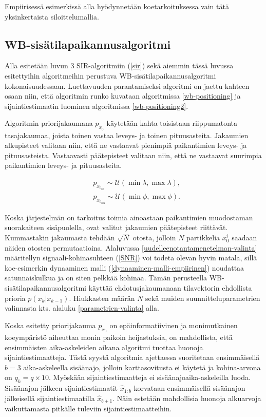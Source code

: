 \documentclass[
  12pt,
  a4paper, twoside]{book}
\begin{document}
Empiirisessä esimerkissä alla hyödynnetään koetarkoituksessa vain tätä yksinkertaista siloittelumallia.

\subsection{WB-sisätilapaikannusalgoritmi}

Alla esitetään luvun 3 SIR-algoritmiin (\ref{sir}) sekä aiemmin tässä luvussa esitettyihin algoritmeihin perustuva WB-sisätilapaikannusalgoritmi kokonaisuudessaan. Luettavuuden parantamiseksi algoritmi on jaettu kahteen osaan niin, että algoritmin runko kuvataan algoritmissa \ref{wb-positioning} ja sijaintiestimaatin luominen algoritmissa \ref{wb-positioning2}.

Algoritmin priorijakaumana \(p_{x_0}\) käytetään kahta toisistaan riippumatonta tasajakaumaa, joista toinen vastaa leveys- ja toinen pituusasteita. Jakaumien alkupisteet valitaan niin, että ne vastaavat pienimpiä paikantimien leveys- ja pituusasteista. Vastaavasti päätepisteet valitaan niin, että ne vastaavat suurimpia paikantimien leveys- ja pituusasteita.

\begin{align} \label{priorijakauma}
&p_{x_{0_{\text{lat}}}}\sim\mathcal{U}(\min{\lambda},\max{\lambda}),\\
&p_{x_{0_{\text{lon}}}}\sim\mathcal{U}(\min{\phi},\max{\phi}).
\end{align}

\noindent Koska järjestelmän on tarkoitus toimia ainoastaan paikantimien muodostaman suorakaiteen sisäpuolella, ovat valitut jakaumien päätepisteet riittävät. Kummastakin jakaumasta tehdään \(\sqrt{N}\) otosta, jolloin \(N\) partikkelia \(x^i_0\) saadaan näiden otosten permutaatioina. Alaluvussa \ref{uudelleenotantamenetelman-valinta} määritellyn signaali-kohinasuhteen (\ref{SNR}) voi todeta olevan hyvin matala, sillä koe-esimerkin dynaaminen malli (\ref{dynaaminen-malli-empiirinen}) noudattaa satunnaiskulkua ja on siten pelkkää kohinaa. Tämän perusteella WB-sisätilapaikannusalgoritmi käyttää ehdotusjakaumanaan tilavektorin ehdollista prioria \(p(x_k|x_{k-1})\). Hiukkasten määrän \(N\) sekä muiden suunnitteluparametrien valinnasta kts. alaluku \ref{parametrien-valinta} alla.

Koska esitetty priorijakauma \(p_{x_0}\) on epäinformatiivinen ja monimutkainen koeympäristö aiheuttaa monin paikoin heijastuksia, on mahdollista, että ensimmäisten aika-askeleiden aikana algoritmi tuottaa huonoja sijaintiestimaatteja. Tästä syystä algoritmia ajettaessa suoritetaan ensimmäisellä \(b=3\) aika-askeleella sisäänajo, jolloin karttasovitusta ei käytetä ja kohina-arvona on \(q_{k}=q\times10\). Myöskään sijaintiestimaatteja ei sisäänajoaika-askeleilla luoda. Sisäänajon jälkeen sijaintiestimaatit \(\hat{x}_{1:b}\) korvataan ensimmäisellä sisäänajon jälkeisellä sijaintiestimaatilla \(\hat{x}_{b+1}\). Näin estetään mahdollisia huonoja alkuarvoja vaikuttamasta pitkälle tuleviin sijaintiestimaatteihin.
\end{document}
